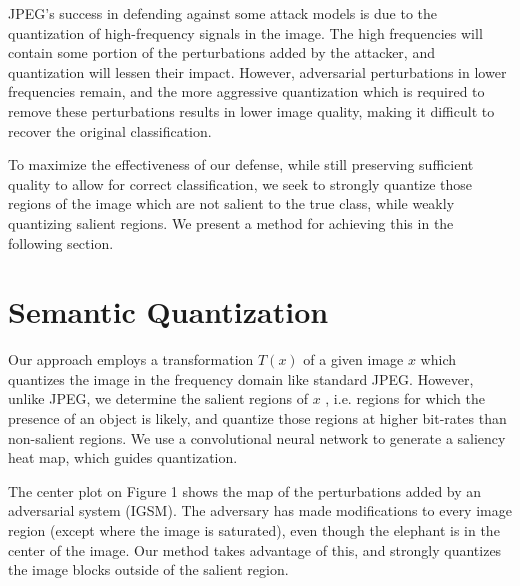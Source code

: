 JPEG's success in defending against some attack models is due to the quantization of high-frequency signals in the image.
The high frequencies will contain some portion of the perturbations added by the attacker, and quantization will lessen their impact.
However, adversarial perturbations in lower frequencies remain, and the more aggressive quantization which is required to remove these perturbations results in lower image quality, making it difficult to recover the original classification.



 

To maximize the effectiveness of our defense, while still preserving sufficient quality to allow for correct classification, we seek to strongly quantize those regions of the image which are not salient to the true class, while weakly quantizing salient regions.
We present a method for achieving this in the following section.

\section{Semantic Quantization}

Our approach employs a transformation $T(x)$ of a given image $x$ which quantizes the image in the frequency domain like standard JPEG.
However, unlike JPEG, we determine the salient regions of $x$ , i.e. regions for which the presence of an object is likely, and quantize those regions at higher bit-rates than non-salient regions.
We use a convolutional neural network to generate a saliency heat map, %
which guides quantization.

The center plot on Figure 1 shows the map of the perturbations added by an adversarial system (IGSM). The adversary has made modifications to every image region (except where the image is saturated), even though the elephant is in the center of the image. Our method takes advantage of this, and strongly quantizes the image blocks outside of the salient region. %

